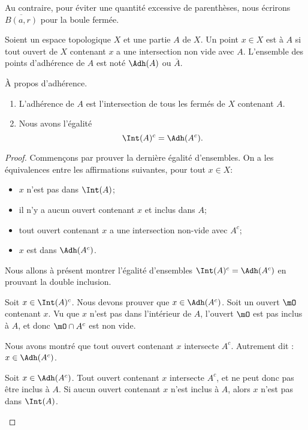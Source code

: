 Au contraire, pour éviter une quantité excessive de parenthèses, nous écrirons \( \overline{ B(a,r) }\) pour la boule fermée.

\begin{definition}      \label{DEFooSVWMooLpAVZR}
    Soient un espace topologique \( X\) et une partie \( A\) de \( X\). Un point \( x\in X\) est  à \( A\) si tout ouvert de \( X\) contenant \( x\) a une intersection non vide avec \( A\). L'ensemble des points d'adhérence de \( A\) est noté \( \Adh(A)\) ou \( \bar A\). 
\end{definition}

\begin{lemma}       \label{LEMooILNCooOFZaTe}
	À propos d'adhérence.
	\begin{enumerate}
		\item
		      L'adhérence de \( A\) est l'intersection de tous les fermés de \( X\) contenant \( A\).
		\item
		      Nous avons l'égalité
		      \begin{equation}
			      \Int(A)^c = \Adh(A^c).
		      \end{equation}
	\end{enumerate}
\end{lemma}

\begin{proof}
	Commençons par prouver la dernière égalité d'ensembles. On a les équivalences entre les affirmations suivantes, pour tout \( x \in X\):
	\begin{itemize}
		\item \( x\) n'est pas dans \( \Int(A)\);
		\item il n'y a aucun ouvert contenant \( x\) et inclus dans \( A\);
		\item tout ouvert contenant \( x\) a une intersection non-vide avec \( A^c\);
		\item \( x\) est dans \( \Adh({A^c})\).
	\end{itemize}
	Nous allons à présent montrer l'égalité d'ensembles \( \Int(A)^c=\Adh(A^c) \) en prouvant la double inclusion.
	\begin{subproof}
		Soit \( x\in \Int(A)^c\). Nous devons prouver que \( x\in \Adh(A^c)\). Soit un ouvert \( \mO\) contenant \( x\). Vu que \( x\) n'est pas dans l'intérieur de \( A\), l'ouvert \( \mO\) est pas inclus à \( A\), et donc \( \mO\cap A^c\) est non vide.

		Nous avons montré que tout ouvert contenant \( x\) intersecte \( A^c\). Autrement dit : \( x\in\Adh(A^c)\).


		Soit \( x\in \Adh(A^c)\). Tout ouvert contenant \( x\) intersecte \( A^c\), et ne peut donc pas être inclus à \( A\). Si aucun ouvert contenant \( x\) n'est inclus à \( A\), alors \( x\) n'est pas dans \( \Int(A)\).
	\end{subproof}
\end{proof}

